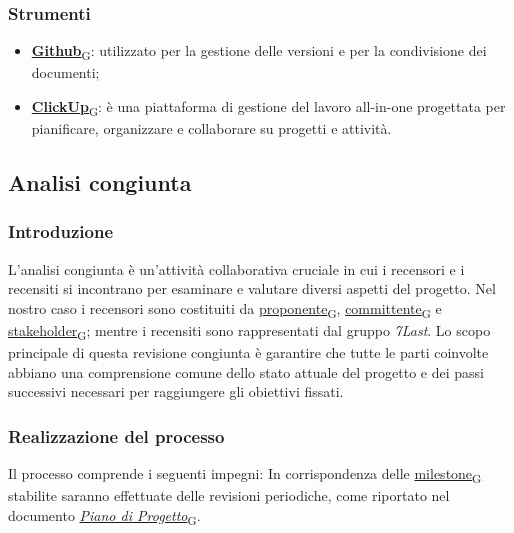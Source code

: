 \subsubsection{Strumenti}

\begin{itemize}
	\item \href{https://7last.github.io/docs/rtb/documentazione-interna/glossario\#github}{\textbf{Github}\textsubscript{G}}: utilizzato per la gestione delle versioni e per la condivisione dei documenti;
	\item \href{https://7last.github.io/docs/rtb/documentazione-interna/glossario\#clickup}{\textbf{ClickUp}\textsubscript{G}}: è una piattaforma di gestione del lavoro all-in-one progettata per pianificare, organizzare e collaborare su progetti e attività.
\end{itemize}


\subsection{Analisi congiunta}
\subsubsection{Introduzione}
L'analisi congiunta è un'attività collaborativa cruciale in cui i recensori e i recensiti si incontrano per esaminare e valutare diversi aspetti del progetto.  Nel nostro caso i recensori sono costituiti da \href{https://7last.github.io/docs/rtb/documentazione-interna/glossario\#proponente}{proponente\textsubscript{G}}, \href{https://7last.github.io/docs/rtb/documentazione-interna/glossario\#committente}{committente\textsubscript{G}} e \href{https://7last.github.io/docs/rtb/documentazione-interna/glossario\#stakeholder}{stakeholder\textsubscript{G}}; mentre i recensiti sono rappresentati dal gruppo \textit{7Last}. Lo scopo principale di questa revisione congiunta è garantire che tutte le parti coinvolte abbiano una comprensione comune dello stato attuale del progetto e dei passi successivi necessari per raggiungere gli obiettivi fissati.

\subsubsection{Realizzazione del processo}
Il processo comprende i seguenti impegni:
In corrispondenza delle \href{https://7last.github.io/docs/rtb/documentazione-interna/glossario\#milestone}{milestone\textsubscript{G}} stabilite saranno effettuate delle revisioni periodiche, come riportato nel
documento \href{https://7last.github.io/docs/rtb/documentazione-interna/glossario\#piano-di-progetto}{\textit{Piano di Progetto}\textsubscript{G}}.

